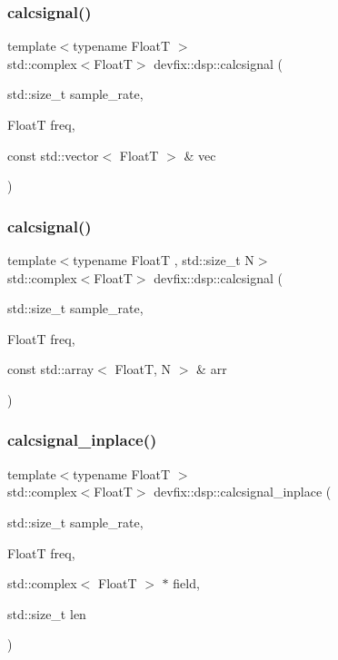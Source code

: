 \subsubsection{\texorpdfstring{calcsignal()}{calcsignal()}\hspace{0.1cm}{\footnotesize\ttfamily [2/3]}}
{\footnotesize\ttfamily template$<$typename FloatT $>$ \\
std\+::complex$<$FloatT$>$ devfix\+::dsp\+::calcsignal (\begin{DoxyParamCaption}\item[{std\+::size\+\_\+t}]{sample\+\_\+rate,  }\item[{FloatT}]{freq,  }\item[{const std\+::vector$<$ FloatT $>$ \&}]{vec }\end{DoxyParamCaption})}

\mbox{\label{namespacedevfix_1_1dsp_af2156150e070c8ec603f0134371187d4}} 
\subsubsection{\texorpdfstring{calcsignal()}{calcsignal()}\hspace{0.1cm}{\footnotesize\ttfamily [3/3]}}
{\footnotesize\ttfamily template$<$typename FloatT , std\+::size\+\_\+t N$>$ \\
std\+::complex$<$FloatT$>$ devfix\+::dsp\+::calcsignal (\begin{DoxyParamCaption}\item[{std\+::size\+\_\+t}]{sample\+\_\+rate,  }\item[{FloatT}]{freq,  }\item[{const std\+::array$<$ FloatT, N $>$ \&}]{arr }\end{DoxyParamCaption})}

\mbox{\label{namespacedevfix_1_1dsp_a38dc66c795b9ebe6e8408d95c7a006c9}} 
\subsubsection{\texorpdfstring{calcsignal\+\_\+inplace()}{calcsignal\_inplace()}\hspace{0.1cm}{\footnotesize\ttfamily [1/3]}}
{\footnotesize\ttfamily template$<$typename FloatT $>$ \\
std\+::complex$<$FloatT$>$ devfix\+::dsp\+::calcsignal\+\_\+inplace (\begin{DoxyParamCaption}\item[{std\+::size\+\_\+t}]{sample\+\_\+rate,  }\item[{FloatT}]{freq,  }\item[{std\+::complex$<$ FloatT $>$ $\ast$}]{field,  }\item[{std\+::size\+\_\+t}]{len }\end{DoxyParamCaption})}

